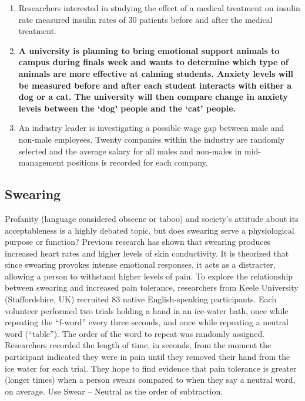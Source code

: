 \documentclass[
]{report}
\begin{document}
\begin{enumerate}
\def\labelenumi{\arabic{enumi}.}
\item
  Researchers interested in studying the effect of a medical treatment on insulin rate measured insulin rates of 30 patients before and after the medical treatment.
  \vspace{0.3in}
\item
  \textbf{A university is planning to bring emotional support animals to campus during finals week and wants to determine which type of animals are more effective at calming students. Anxiety levels will be measured before and after each student interacts with either a dog or a cat. The university will then compare change in anxiety levels between the `dog' people and the `cat' people.}
  \vspace{0.3in}
\item
  An industry leader is investigating a possible wage gap between male and non-male employees. Twenty companies within the industry are randomly selected and the average salary for all males and non-males in mid-management positions is recorded for each company.
  \vspace{0.3in}
\end{enumerate}

\hypertarget{swearing}{%
\subsection{Swearing}\label{swearing}}

Profanity (language considered obscene or taboo) and society's attitude about its acceptableness is a highly debated topic, but does swearing serve a physiological purpose or function? Previous research has shown that swearing produces increased heart rates and higher levels of skin conductivity. It is theorized that since swearing provokes intense emotional responses, it acts as a distracter, allowing a person to withstand higher levels of pain. To explore the relationship between swearing and increased pain tolerance, researchers from Keele University (Staffordshire, UK) recruited 83 native English-speaking participants. Each volunteer performed two trials holding a hand in an ice-water bath, once while repeating the ``f-word'' every three seconds, and once while repeating a neutral word (``table''). The order of the word to repeat was randomly assigned. Researchers recorded the length of time, in seconds, from the moment the participant indicated they were in pain until they removed their hand from the ice water for each trial. They hope to find evidence that pain tolerance is greater (longer times) when a person swears compared to when they say a neutral word, on average. Use Swear -- Neutral as the order of subtraction.
\end{document}
